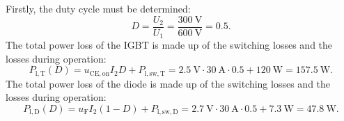\begin{solutionblock}
Firstly, the duty cycle must be determined:
\begin{equation}
    D = \frac{U_\mathrm{2}}{U_\mathrm{1}} = \frac{\SI{300}{\volt}}{\SI{600}{\volt}} = 0.5.
\end{equation}
The total power loss of the IGBT is made up of the switching losses and the losses during operation:
\begin{equation}
    P_{\mathrm{l,T}}(D) = u_{\mathrm{CE,on}} I_\mathrm{2} D +  P_{\mathrm{l,sw,T}} = \SI{2.5}{\volt} \cdot \SI{30}{\ampere} \cdot 0.5 + \SI{120}{\watt} = \SI{157.5}{\watt}.
\end{equation}
The total power loss of the diode is made up of the switching losses and the losses during operation:
\begin{equation}
    P_{\mathrm{l,D}}(D) = u_{\mathrm{F}} I_\mathrm{2} (1-D) +  P_{\mathrm{l,sw,D}} = \SI{2.7}{\volt} \cdot \SI{30}{\ampere} \cdot 0.5 + \SI{7.3}{\watt} = \SI{47.8}{\watt}.
\end{equation}
\end{solutionblock}
    